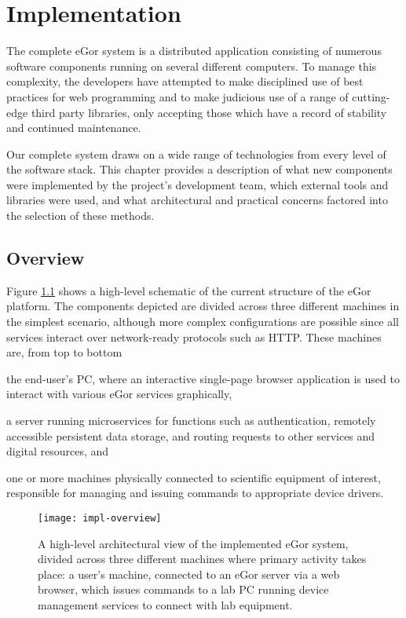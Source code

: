 \documentclass[../thesis]{subfiles}
\begin{document}
\chapter{Implementation}


The complete eGor system is a distributed application consisting of
numerous software components running on several different
computers. To manage this complexity, the developers have attempted to
make disciplined use of best practices for web programming and to make
judicious use of a range of cutting-edge third party libraries, only
accepting those which have a record of stability and continued
maintenance.

Our complete system draws on a wide range of technologies from every
level of the software stack. This chapter provides a description of
what new components were implemented by the project's development
team, which external tools and libraries were used, and what
architectural and practical concerns factored into the selection of
these methods.



\section{Overview}

Figure \ref{fig:ImplOverview} shows a high-level schematic of the
current structure of the eGor platform. The components depicted are
divided across three different machines in the simplest scenario,
although more complex configurations are possible since all services
interact over network-ready protocols such as HTTP. These machines
are, from top to bottom
\begin{enumerate*}[label=(\roman*)]
  \item{
      the end-user's PC, where an interactive single-page browser
      application is used to interact with various eGor services
      graphically,
  }
  \item{
      a server running microservices for functions such as
      authentication, remotely accessible persistent data storage, and
      routing requests to other services and digital resources, and
  }
  \item{
      one or more machines physically connected to scientific
      equipment of interest, responsible for managing and issuing
      commands to appropriate device drivers.
  }
\end{enumerate*}

\begin{figure}
  \texttt{[image: impl-overview]}
  \caption{
    A high-level architectural view of the implemented eGor system,
    divided across three different machines where primary activity
    takes place: a user's machine, connected to an eGor server via a
    web browser, which issues commands to a lab PC running device
    management services to connect with lab equipment.
    \label{fig:ImplOverview}
  }
\end{figure}
\end{document}
